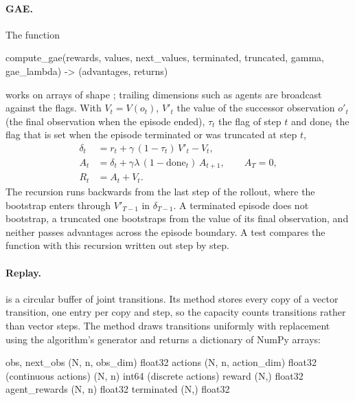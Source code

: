 \paragraph{GAE.} The function

\begin{pycode}
compute_gae(rewards, values, next_values, terminated, truncated, gamma,
            gae_lambda) -> (advantages, returns)
\end{pycode}
works on arrays of shape ; trailing dimensions such as
agents are broadcast against the  flags. With $V_t = V(o_t)$,
$V'_t$ the value of the successor observation $o'_t$ (the final observation
when the episode ended), $\tau_t$ the  flag of step $t$ and
$\mathrm{done}_t$ the flag that is set when the episode terminated or was
truncated at step $t$,
\begin{align}
  \delta_t &= r_t + \gamma\,(1 - \tau_t)\, V'_t - V_t, \label{eq:marl-td}\\
  A_t &= \delta_t + \gamma \lambda\, (1 - \mathrm{done}_t)\, A_{t+1},
  \qquad A_T = 0, \label{eq:marl-gae}\\
  R_t &= A_t + V_t. \nonumber
\end{align}
The recursion runs backwards from the last step of the rollout, where the
bootstrap enters through $V'_{T-1}$ in $\delta_{T-1}$. A terminated episode
does not bootstrap, a truncated one bootstraps from the value of its final
observation, and neither passes advantages across the episode boundary. A test
compares the function with this recursion written out step by step.

\paragraph{Replay.}  is a circular buffer of
joint transitions. Its method  stores every copy of a
vector transition, one entry per copy and step, so the capacity counts
transitions rather than vector steps. The method  draws transitions uniformly with replacement using the algorithm's
generator and returns a dictionary of NumPy arrays:

\begin{textcode}
obs, next_obs      (N, n, obs_dim)       float32
actions            (N, n, action_dim)    float32   (continuous actions)
                   (N, n)                int64     (discrete actions)
reward             (N,)                  float32
agent_rewards      (N, n)                float32
terminated         (N,)                  float32
\end{textcode}


